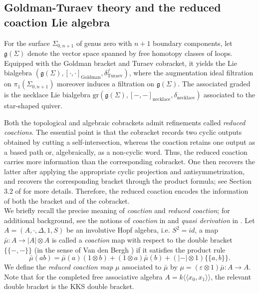 \documentclass[a4paper,fleqn]{cas-sc}
\newcommand{\g}{\mathfrak{g}}
\newcommand{\ldb}{\{\!\!\{}
\newcommand{\rdb}{\}\!\!\}}
\begin{document}
\subsection{Goldman-Turaev theory and the reduced coaction Lie algebra} 
\label{subsec:coaction-background}
For the surface $\Sigma_{0,n+1}$ of genus zero with $n+1$ boundary components, let $\g(\Sigma)$ denote the vector space spanned by free homotopy classes of loops. Equipped with the Goldman bracket and Turaev cobracket, it yields the Lie bialgebra $\left( \g(\Sigma),[\cdot,\cdot]_{\mathrm{Goldman}}, \delta^f_{\mathrm{Turaev}} \right)$, where the augmentation ideal filtration on $\pi_1(\Sigma_{0,n+1})$ moreover induces a filtration on $\g(\Sigma)$. The associated graded is the necklace Lie bialgebra $\mathrm{gr}(\g(\Sigma), [-,-]_{\mathrm{necklace}}, \delta_{\mathrm{necklace}})$ associated to the star-shaped quiver.

Both the topological and algebraic cobrackets admit refinements called
\emph{reduced coactions}. The essential point is that the cobracket
records two cyclic outputs obtained by cutting a self-intersection,
whereas the coaction retains one output as a based path or,
algebraically, as a non-cyclic word. Thus, the reduced coaction carries
more information than the corresponding cobracket. One then recovers the latter after applying the
appropriate cyclic projection and antisymmetrization, and recovers the corresponding bracket through the product formula; see Section 3.2 of \cite{ANR} for more details. Therefore, the reduced coaction encodes the information of both the bracket and of the cobracket. \\

We briefly recall the precise meaning of \textit{coaction} and \textit{reduced coaction}; for additional background, see the notions of \textit{coaction} in \cite{Kawazumi2015} and \textit{quasi derivation} in \cite{Massuyeau2018}. Let $A=(A, \cdot, \Delta, 1, S)$ be an involutive Hopf algebra, i.e. $S^2=id$, a map $\bar{\mu}: A \to |A| \otimes A$ is called a \emph{coaction} map with respect to the double bracket $\ldb -, - \rdb$ (in the sense of  Van den Bergh \cite{double_poisson}) if it satisfies the product rule
%
\begin{equation}   \label{eq:mu_mult}
	\bar{\mu}(ab)=\bar{\mu}(a)(1\otimes b)+(1\otimes a)\bar{\mu}(b)+(|-|\otimes 1)\ldb a,b\rdb.
\end{equation}
We define the \emph{reduced coaction map} $\mu$ associated to $\bar{\mu}$ by 
$\mu=(\varepsilon \otimes 1)\bar{\mu}: A \to A$. Note that for the completed free associative algebra $A=k\langle\!\langle x_0,x_1\rangle\!\rangle$,
the relevant double bracket is the KKS double bracket.
\end{document}
